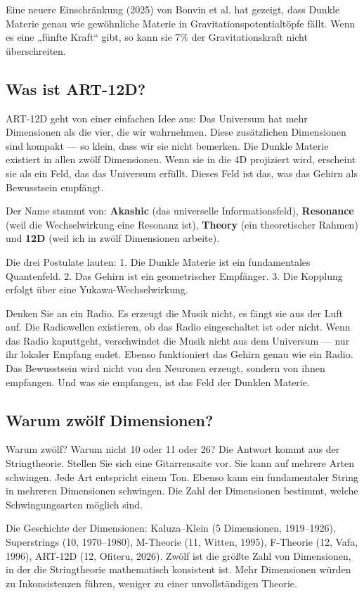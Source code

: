 Eine neuere Einschränkung (2025) von Bonvin et al. hat gezeigt, dass Dunkle Materie genau wie gewöhnliche Materie in Gravitationspotentialtöpfe fällt. Wenn es eine „fünfte Kraft`` gibt, so kann sie 7\% der Gravitationskraft nicht überschreiten.

\subsection{Was ist ART-12D?}
ART-12D geht von einer einfachen Idee aus: Das Universum hat mehr Dimensionen als die vier, die wir wahrnehmen. Diese zusätzlichen Dimensionen sind kompakt --- so klein, dass wir sie nicht bemerken. Die Dunkle Materie existiert in allen zwölf Dimensionen. Wenn sie in die 4D projiziert wird, erscheint sie als ein Feld, das das Universum erfüllt. Dieses Feld ist das, was das Gehirn als Bewusstsein empfängt.

Der Name stammt von: \textbf{Akashic} (das universelle Informationsfeld), \textbf{Resonance} (weil die Wechselwirkung eine Resonanz ist), \textbf{Theory} (ein theoretischer Rahmen) und \textbf{12D} (weil ich in zwölf Dimensionen arbeite).

Die drei Postulate lauten: 1. Die Dunkle Materie ist ein fundamentales Quantenfeld. 2. Das Gehirn ist ein geometrischer Empfänger. 3. Die Kopplung erfolgt über eine Yukawa-Wechselwirkung.

Denken Sie an ein Radio. Es erzeugt die Musik nicht, es fängt sie aus der Luft auf. Die Radiowellen existieren, ob das Radio eingeschaltet ist oder nicht. Wenn das Radio kaputtgeht, verschwindet die Musik nicht aus dem Universum --- nur ihr lokaler Empfang endet. Ebenso funktioniert das Gehirn genau wie ein Radio. Das Bewusstsein wird nicht von den Neuronen erzeugt, sondern von ihnen empfangen. Und was sie empfangen, ist das Feld der Dunklen Materie.

\subsection{Warum zwölf Dimensionen?}
Warum zwölf? Warum nicht 10 oder 11 oder 26? Die Antwort kommt aus der Stringtheorie. Stellen Sie sich eine Gitarrensaite vor. Sie kann auf mehrere Arten schwingen. Jede Art entspricht einem Ton. Ebenso kann ein fundamentaler String in mehreren Dimensionen schwingen. Die Zahl der Dimensionen bestimmt, welche Schwingungsarten möglich sind.

Die Geschichte der Dimensionen: Kaluza--Klein (5 Dimensionen, 1919--1926), Superstrings (10, 1970--1980), M-Theorie (11, Witten, 1995), F-Theorie (12, Vafa, 1996), ART-12D (12, Ofiteru, 2026). Zwölf ist die größte Zahl von Dimensionen, in der die Stringtheorie mathematisch konsistent ist. Mehr Dimensionen würden zu Inkonsistenzen führen, weniger zu einer unvollständigen Theorie.

